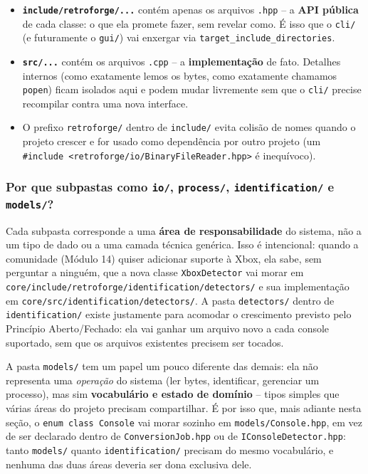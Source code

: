\begin{itemize}
    \item \textbf{\texttt{include/retroforge/...}} contém apenas os arquivos \texttt{.hpp} -- a \textbf{API pública} de cada classe: o que ela promete fazer, sem revelar como. É isso que o \texttt{cli/} (e futuramente o \texttt{gui/}) vai enxergar via \texttt{target\_include\_directories}.
    \item \textbf{\texttt{src/...}} contém os arquivos \texttt{.cpp} -- a \textbf{implementação} de fato. Detalhes internos (como exatamente lemos os bytes, como exatamente chamamos \texttt{popen}) ficam isolados aqui e podem mudar livremente sem que o \texttt{cli/} precise recompilar contra uma nova interface.
    \item O prefixo \texttt{retroforge/} dentro de \texttt{include/} evita colisão de nomes quando o projeto crescer e for usado como dependência por outro projeto (um \texttt{\#include <retroforge/io/BinaryFileReader.hpp>} é inequívoco).
\end{itemize}

\subsubsection{Por que subpastas como \texttt{io/}, \texttt{process/}, \texttt{identification/} e \texttt{models/}?}

Cada subpasta corresponde a uma \textbf{área de responsabilidade} do sistema, não a um tipo de dado ou a uma camada técnica genérica. Isso é intencional: quando a comunidade (Módulo 14) quiser adicionar suporte à Xbox, ela sabe, sem perguntar a ninguém, que a nova classe \texttt{XboxDetector} vai morar em \texttt{core/include/retroforge/identification/detectors/} e sua implementação em \texttt{core/src/identification/detectors/}. A pasta \texttt{detectors/} dentro de \texttt{identification/} existe justamente para acomodar o crescimento previsto pelo Princípio Aberto/Fechado: ela vai ganhar um arquivo novo a cada console suportado, sem que os arquivos existentes precisem ser tocados.

A pasta \texttt{models/} tem um papel um pouco diferente das demais: ela não representa uma \textit{operação} do sistema (ler bytes, identificar, gerenciar um processo), mas sim \textbf{vocabulário e estado de domínio} -- tipos simples que várias áreas do projeto precisam compartilhar. É por isso que, mais adiante nesta seção, o \texttt{enum class Console} vai morar sozinho em \texttt{models/Console.hpp}, em vez de ser declarado dentro de \texttt{ConversionJob.hpp} ou de \texttt{IConsoleDetector.hpp}: tanto \texttt{models/} quanto \texttt{identification/} precisam do mesmo vocabulário, e nenhuma das duas áreas deveria ser dona exclusiva dele.

